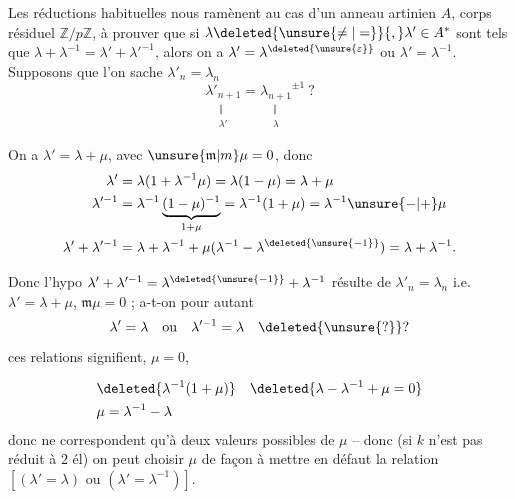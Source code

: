Les réductions habituelles nous ramènent au cas d'un anneau   artinien $A$, corps résiduel  $\mathbb Z/p\mathbb Z$, à prouver que si $\lambda\deleted{\unsure{\ne|=}}{,}\lambda'\in A^*$ sont tels que $\lambda+\lambda^{-1}=\lambda'+\lambda'^{-1}$, alors on a $\lambda'=\lambda^{\deleted{\unsure{\varepsilon}}}$ ou $\lambda'=\lambda^{-1}$. Supposons que l'on sache $\lambda'_n=\lambda_n$ 
\[
\underset{\substack{\Vert\\\lambda'}}{\lambda'_{n+1}}=\underset{\substack{\Vert\\\lambda}}{\lambda_{n+1}}^{\pm1}\ ?
\]

On a  $\lambda'=\lambda+\mu$, avec $\unsure{\mathfrak m|m}\mu=0$,  donc
\[
\begin{aligned}
\lambda'&=\lambda(1+\lambda^{-1}\mu)=\lambda(1-\mu)=\lambda+\mu\\
\lambda'^{-1}&=\lambda^{-1}\underbrace{(1-\mu)^{-1}}_{1+\mu}=\lambda^{-1}(1+\mu)=\lambda^{-1}\unsure{-|+}\mu\\
\lambda'+\lambda'^{-1}&=\lambda+\lambda^{-1}+\mu(\lambda^{-1}-\lambda^{\deleted{\unsure{-1}}})=\lambda+\lambda^{-1}.
\end{aligned}
\]

Donc l'hypo $\lambda'+\lambda'^{-1}=\lambda^{\deleted{\unsure{-1}}}+\lambda^{-1}$ résulte de $\lambda'_n=\lambda_n$ i.e. $\lambda'=\lambda+\mu$, $\mathfrak m\mu=0$  ; a-t-on pour autant
\[
\lambda'=\lambda\quad\text{ou}\quad\lambda'^{-1}=\lambda\quad\deleted{\unsure{?}}?
\]
  ces relations signifient,   $\mu=0$,

  
\[
\begin{aligned}
&\deleted{\lambda^{-1}(1+\mu)}\quad\deleted{\lambda-\lambda^{-1}+\mu=0}\\
&\mu=\lambda^{-1}-\lambda
\end{aligned}
\]
donc ne correspondent qu'à deux valeurs possibles  de $\mu$ -- donc (si $k$ n'est pas réduit à $2$ él) on peut choisir $\mu$ de façon à mettre en défaut la relation $[(\lambda'=\lambda)\text{ ou }(\lambda'=\lambda^{-1})]$.
